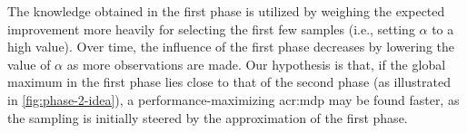 The knowledge obtained in the first phase is utilized by weighing the expected improvement more heavily for selecting the first few samples (i.e., setting $\alpha$ to a high value).
Over time, the influence of the first phase decreases by lowering the value of $\alpha$ as more observations are made.
Our hypothesis is that, if the global maximum in the first phase lies close to that of the second phase (as illustrated in \autoref{fig:phase-2-idea}), a performance-maximizing \acrshort{acr:mdp} may be found faster, as the sampling is initially steered by the approximation of the first phase.

\newpage

%




